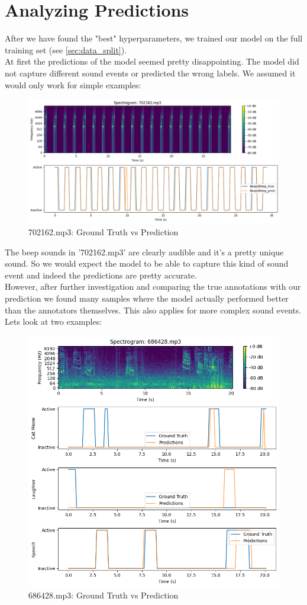 \documentclass{article}
\begin{document}
\pagebreak
\section{Analyzing Predictions}
\label{sec:analyzing_predictions}
After we have found the "best" hyperparameters, we trained our model on the full training set (see \ref{sec:data_split}). \\
At first the predictions of the model seemed pretty disappointing. The model did not capture different sound events or predicted the wrong labels. We assumed it would only work for simple examples:

\begin{figure}[H]
  \centering
  \includegraphics[width=0.75\linewidth]{702162_pred.png}
  \caption{702162.mp3: Ground Truth vs Prediction}
  \label{fig3}
\end{figure}

The beep sounds in '702162.mp3' are clearly audible and it's a pretty unique sound. So we would expect the model to be able to capture this kind of sound event and indeed the predictions are pretty accurate. \\
However, after further investigation and comparing the true annotations with our prediction we found many samples where the model actually performed better than the annotators themselves. This also applies for more complex sound events. Lets look at two examples:

\begin{figure}[H]
  \centering
  \includegraphics[width=0.6\linewidth]{686428_pred.png}
  \caption{686428.mp3: Ground Truth vs Prediction}
  \label{fig4}
\end{figure}
\end{document}
